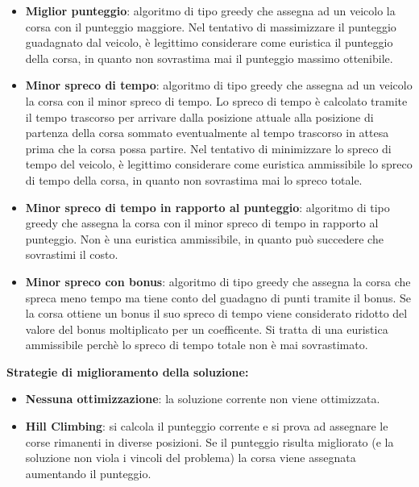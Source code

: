 \documentclass[11pt,a4paper]{article}
\begin{document}
	\begin{itemize}
		\item \textbf{Miglior punteggio}: algoritmo di tipo greedy che assegna ad un veicolo la corsa con il punteggio maggiore. Nel tentativo di massimizzare il punteggio guadagnato dal veicolo, è legittimo considerare come euristica il punteggio della corsa, in quanto non sovrastima mai il punteggio massimo ottenibile.
		\item \textbf{Minor spreco di tempo}: algoritmo di tipo greedy che assegna ad un veicolo la corsa con il minor spreco di tempo. %
	Lo spreco di tempo è calcolato tramite il tempo trascorso per arrivare dalla posizione attuale alla posizione di partenza della corsa sommato eventualmente al tempo trascorso in attesa prima che la corsa possa partire. Nel tentativo di minimizzare lo spreco di tempo del veicolo, è legittimo considerare come euristica ammissibile lo spreco di tempo della corsa, in quanto non sovrastima mai lo spreco totale.
		\item \textbf{Minor spreco di tempo in rapporto al punteggio}: algoritmo di tipo greedy che assegna la corsa con il minor spreco di tempo in rapporto al punteggio. Non è una euristica ammissibile, in quanto può succedere che sovrastimi il costo.
		\item \textbf{Minor spreco con bonus}: algoritmo di tipo greedy che assegna la corsa che spreca meno tempo ma tiene conto del guadagno di punti tramite il bonus. Se la corsa ottiene un bonus il suo spreco di tempo viene considerato ridotto del valore del bonus moltiplicato per un coefficente. Si tratta di una euristica ammissibile perchè lo spreco di tempo totale non è mai sovrastimato. 	
	\end{itemize}
\newpage
\textbf{Strategie di miglioramento della soluzione:}
	\begin{itemize}
		\item \textbf{Nessuna ottimizzazione}: la soluzione corrente non viene ottimizzata.
		\item \textbf{Hill Climbing}: si calcola il punteggio corrente e si prova ad assegnare le corse rimanenti in diverse posizioni. Se il punteggio risulta migliorato (e la soluzione non viola i vincoli del problema) la corsa viene assegnata aumentando il punteggio.
	\end{itemize}
\end{document}
